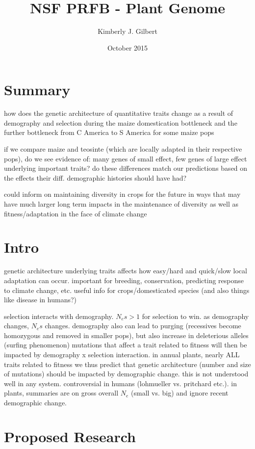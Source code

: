 \documentclass[10pt, letterpaper]{article}
\title{NSF PRFB - Plant Genome}
\author{Kimberly J. Gilbert}
\date{October 2015}
\begin{document}
\section{Summary}

how does the genetic architecture of quantitative traits change as a result of demography and selection during the maize domestication bottleneck and the further bottleneck from C America to S America for some maize pops
	
if we compare maize and teosinte (which are locally adapted in their respective pops), do we see evidence of:
	many genes of small effect, few genes of large effect underlying important traits?
	do these differences match our predictions based on the effects their diff. demographic histories should have had?
	
could inform on maintaining diversity in crops for the future in ways that may have much larger long term impacts in the maintenance of diversity as well as fitness/adaptation in the face of climate change

\section*{Intro}
	
genetic architecture underlying traits affects how easy/hard and quick/slow local adaptation can occur. important for breeding, conservation, predicting response to climate change, etc.
useful info for crops/domesticated species (and also things like disease in humans?)
	
selection interacts with demography. $N_es>1$ for selection to win.
as demography changes, $N_es$ changes.
demography also can lead to purging (recessives become homozygous and removed in smaller pops), but also increase in deleterious alleles (surfing phenomenon)
mutations that affect a trait related to fitness will then be impacted by demography x selection interaction.
in annual plants, nearly ALL traits related to fitness
we thus predict that genetic architecture (number and size of mutations) should be impacted by demographic change.
this is not understood well in any system. controversial in humans (lohmueller vs. pritchard etc.). in plants, summaries are on gross overall $N_e$ (small vs. big) and ignore recent demographic change.

\section*{Proposed Research}
	
\end{document}
